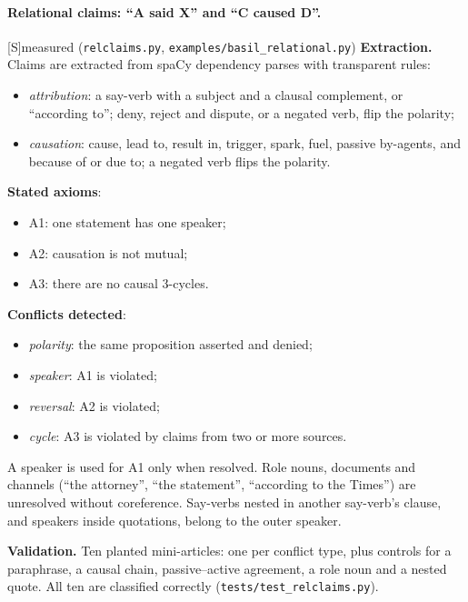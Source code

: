 \documentclass[11pt]{article}
\theoremstyle{definition}
\theoremstyle{remark}
\newcommand{\src}[1]{\textsf{\small[#1]}}
\newcommand{\st}[1]{\textsf{\small\color{gray}#1}}
\begin{document}
\paragraph{Relational claims: ``A said X'' and ``C caused D''.}\src{S}\st{measured} (\texttt{relclaims.py}, \texttt{examples/basil\_relational.py})
\textbf{Extraction.} Claims are extracted from spaCy dependency parses with transparent rules:
\begin{itemize}
  \item \emph{attribution}: a say-verb with a subject and a clausal complement, or ``according to''; deny, reject and dispute, or a negated verb, flip the polarity;
  \item \emph{causation}: cause, lead to, result in, trigger, spark, fuel, passive by-agents, and because of or due to; a negated verb flips the polarity.
\end{itemize}
\textbf{Stated axioms}:
\begin{itemize}
  \item A1: one statement has one speaker;
  \item A2: causation is not mutual;
  \item A3: there are no causal 3-cycles.
\end{itemize}
\textbf{Conflicts detected}:
\begin{itemize}
  \item \emph{polarity}: the same proposition asserted and denied;
  \item \emph{speaker}: A1 is violated;
  \item \emph{reversal}: A2 is violated;
  \item \emph{cycle}: A3 is violated by claims from two or more sources.
\end{itemize}
A speaker is used for A1 only when resolved. Role nouns, documents and channels (``the attorney'', ``the statement'', ``according to the Times'') are unresolved without coreference. Say-verbs nested in another say-verb's clause, and speakers inside quotations, belong to the outer speaker.

\textbf{Validation.} Ten planted mini-articles: one per conflict type, plus controls for a paraphrase, a causal chain, passive--active agreement, a role noun and a nested quote. All ten are classified correctly (\texttt{tests/test\_relclaims.py}).
\end{document}

